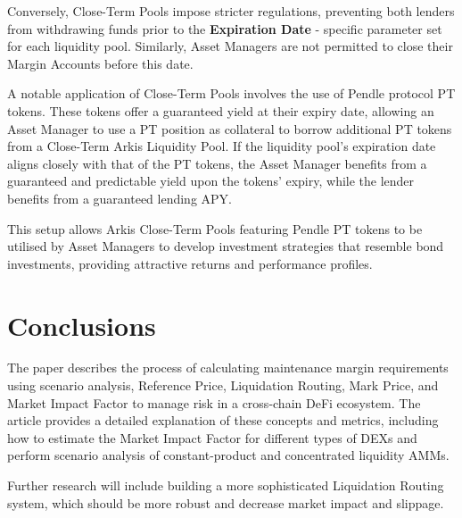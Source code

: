 \documentclass[conference]{IEEEtran}
\begin{document}
Conversely, Close-Term Pools impose stricter regulations, preventing both lenders from withdrawing funds prior to the \textbf{Expiration Date} - specific parameter set for each liquidity pool. Similarly, Asset Managers are not permitted to close their Margin Accounts before this date.

A notable application of Close-Term Pools involves the use of Pendle protocol PT tokens. These tokens offer a guaranteed yield at their expiry date, allowing an Asset Manager to use a PT position as collateral to borrow additional PT tokens from a Close-Term Arkis Liquidity Pool. If the liquidity pool’s expiration date aligns closely with that of the PT tokens, the Asset Manager benefits from a guaranteed and predictable yield upon the tokens' expiry, while the lender benefits from a guaranteed lending APY.

This setup allows Arkis Close-Term Pools featuring Pendle PT tokens to be utilised by Asset Managers to develop investment strategies that resemble bond investments, providing attractive returns and performance profiles.


\section{Conclusions}
The paper describes the process of calculating maintenance margin requirements using scenario analysis, Reference Price, Liquidation Routing, Mark Price, and Market Impact Factor to manage risk in a cross-chain DeFi ecosystem. The article provides a detailed explanation of these concepts and metrics, including how to estimate the Market Impact Factor for different types of DEXs and perform scenario analysis of constant-product and concentrated liquidity AMMs. 

Further research will include building a more sophisticated Liquidation Routing system, which should be more robust and decrease market impact and slippage.






\newpage
\end{document}
